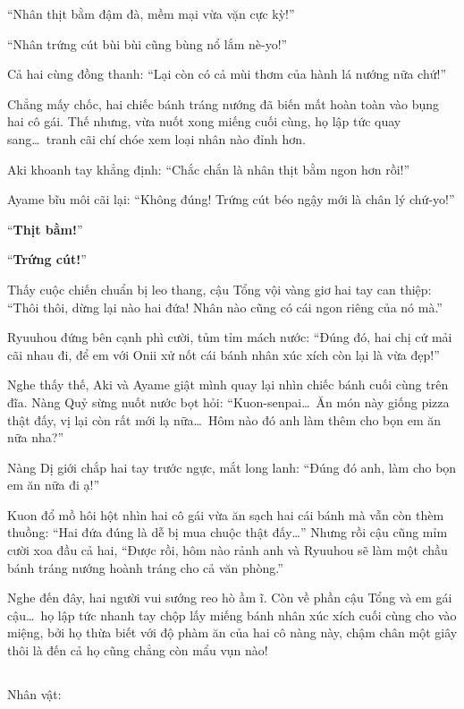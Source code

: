 \documentclass[../main.tex]{subfiles}
\begin{document}
``Nhân thịt bằm đậm đà, mềm mại vừa vặn cực kỳ!''

``Nhân trứng cút bùi bùi cũng bùng nổ lắm nè-yo!''

Cả hai cùng đồng thanh: ``Lại còn có cả mùi thơm của hành lá nướng nữa chứ!''

Chẳng mấy chốc, hai chiếc bánh tráng nướng đã biến mất hoàn toàn vào bụng hai cô gái. Thế nhưng, vừa nuốt xong miếng cuối cùng, họ lập tức quay sang\dots\ tranh cãi chí chóe xem loại nhân nào đỉnh hơn.

Aki khoanh tay khẳng định: ``Chắc chắn là nhân thịt bằm ngon hơn rồi!''

Ayame bĩu môi cãi lại: ``Không đúng! Trứng cút béo ngậy mới là chân lý chứ-yo!''

``\textbf{Thịt bằm!}''

``\textbf{Trứng cút!}''

Thấy cuộc chiến chuẩn bị leo thang, cậu Tổng vội vàng giơ hai tay can thiệp: ``Thôi thôi, dừng lại nào hai đứa! Nhân nào cũng có cái ngon riêng của nó mà.''

Ryuuhou đứng bên cạnh phì cười, tủm tỉm mách nước: ``Đúng đó, hai chị cứ mải cãi nhau đi, để em với Onii xử nốt cái bánh nhân xúc xích còn lại là vừa đẹp!''

Nghe thấy thế, Aki và Ayame giật mình quay lại nhìn chiếc bánh cuối cùng trên đĩa. Nàng Quỷ sừng nuốt nước bọt hỏi: ``Kuon-senpai\dots\ Ăn món này giống pizza thật đấy, vị lại còn rất mới lạ nữa\dots\ Hôm nào đó anh làm thêm cho bọn em ăn nữa nha?''

Nàng Dị giới chắp hai tay trước ngực, mắt long lanh: ``Đúng đó anh, làm cho bọn em ăn nữa đi ạ!''

Kuon đổ mồ hôi hột nhìn hai cô gái vừa ăn sạch hai cái bánh mà vẫn còn thèm thuồng: ``Hai đứa đúng là dễ bị mua chuộc thật đấy\dots'' Nhưng rồi cậu cũng mỉm cười xoa đầu cả hai, ``Được rồi, hôm nào rảnh anh và Ryuuhou sẽ làm một chầu bánh tráng nướng hoành tráng cho cả văn phòng.''

Nghe đến đây, hai người vui sướng reo hò ầm ĩ. Còn về phần cậu Tổng và em gái cậu\dots\ họ lập tức nhanh tay chộp lấy miếng bánh nhân xúc xích cuối cùng cho vào miệng, bởi họ thừa biết với độ phàm ăn của hai cô nàng này, chậm chân một giây thôi là đến cả họ cũng chẳng còn mẩu vụn nào!

\newpage

\subsection*{\label{ep-C9.IV}}
\vspace{-4pt}
\begin{center}
  {\caviar\fontsize{12pt}{12pt}\selectfont Nhân vật:       }
\end{center}
\end{document}
